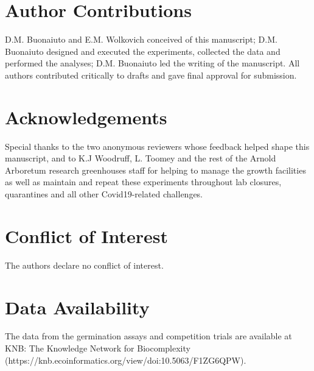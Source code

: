 \documentclass{article}[11pt]
\begin{document}
\section*{Author Contributions} 
D.M. Buonaiuto and E.M. Wolkovich conceived of this manuscript; D.M. Buonaiuto designed and executed the experiments, collected the data and performed the analyses; D.M. Buonaiuto led the writing of the manuscript. All authors contributed critically to drafts and gave final approval for submission.

\section*{Acknowledgements}
Special thanks to the two anonymous reviewers whose feedback helped shape this manuscript, and to K.J Woodruff, L. Toomey and the rest of the Arnold Arboretum research greenhouses staff for helping to manage the growth facilities as well as maintain and repeat these experiments throughout lab closures, quarantines and all other Covid19-related challenges.

\section*{Conflict of Interest}
The authors declare no conflict of interest.

\section*{Data Availability}
The data \citep{D-M-Buonaiuto:2023wj} from the germination assays and competition trials are available at KNB: The Knowledge Network for Biocomplexity (https://knb.ecoinformatics.org/view/doi:10.5063/F1ZG6QPW).
\end{document}
